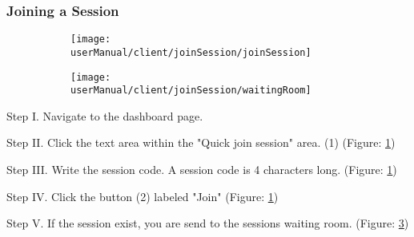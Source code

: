 \subsubsection{Joining a Session}

\begin{figure}[H]
	\begin{subfigure}{0.70\linewidth}
		\texttt{[image: userManual/client/joinSession/joinSession]}
		\caption{}
		\label{fig:joinSession}
	\end{subfigure}
	\begin{subfigure}{0.70\linewidth}
		\texttt{[image: userManual/client/joinSession/waitingRoom]}
		\caption{}
		\label{fig:waitingRoom}
	\end{subfigure}
\end{figure}

\begin{userManualItemlist}
	\item[Step I.] Navigate to the dashboard page.
	\item[Step II.] Click the text area within the "Quick join session" area. (1) (Figure: \ref{fig:joinSession})
	\item[Step III.] Write the session code. A session code is 4 characters long. (Figure: \ref{fig:joinSession})
	\item[Step IV.] Click the button (2) labeled "Join" (Figure: \ref{fig:joinSession}) 
	\item[Step V.] If the session exist, you are send to the sessions waiting room. (Figure: \ref{fig:waitingRoom})
\end{userManualItemlist}